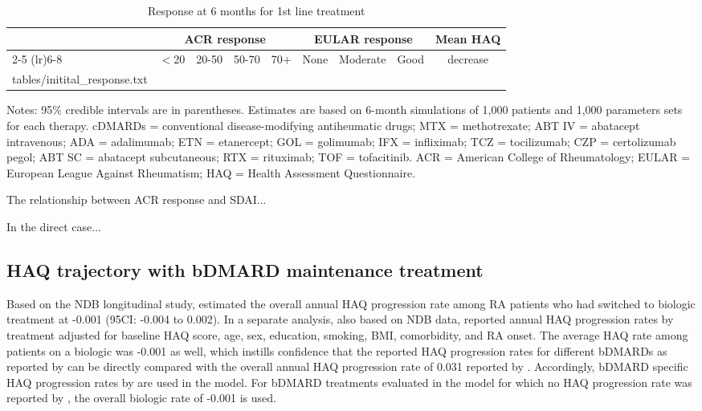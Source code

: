 \documentclass[11pt,final,fleqn]{article}\usepackage[]{graphicx}\usepackage[]{color}
\makeatletter
\theoremstyle{plain}
\newcommand*\ExpandableInput[1]{\@@input#1 }
\makeatother
\begin{document}
\begin{landscape}
\begin{table}[!ht]
\begin{center}
\begin{threeparttable}
\caption{Response at 6 months for 1st line treatment} \label{tbl:initial-haq}
\scriptsize
\begin{tabular}{lrrrrrrrr}
\hline
\multicolumn{1}{c}{} & \multicolumn{4}{c}{ACR response} & \multicolumn{3}{c}{EULAR response} & \multicolumn{1}{c}{\multirow{2}{*}{Mean HAQ}}\\
\cmidrule(lr){2-5} \cmidrule(lr){6-8}
\multicolumn{1}{l}{Treatment} & \multicolumn{1}{c}{$<$20} & \multicolumn{1}{c}{20-50} & \multicolumn{1}{c}{50-70}  & \multicolumn{1}{c}{70+}   & \multicolumn{1}{c}{None} & \multicolumn{1}{c}{Moderate}  & \multicolumn{1}{c}{Good}  & \multicolumn{1}{c}{decrease}\\
\hline
\ExpandableInput{tables/initital_response.txt}
\hline
\end{tabular}
\tiny
Notes: 95\% credible intervals are in parentheses. Estimates are based on 6-month simulations of 1,000 patients and 1,000 parameters sets for each therapy. cDMARDs = conventional disease-modifying antiheumatic drugs; MTX = methotrexate; ABT IV = abatacept intravenous; ADA = adalimumab; ETN = etanercept; GOL = golimumab; IFX = infliximab; TCZ = tocilizumab; CZP = certolizumab pegol; ABT SC = abatacept subcutaneous; RTX = rituximab; TOF = tofacitinib. ACR = American College of Rheumatology; EULAR = European League Against Rheumatism; HAQ = Health Assessment Questionnaire. 
\end{threeparttable}
\end{center}
\end{table}
\end{landscape}

The relationship between ACR response and SDAI...

In the direct case...

\subsection{HAQ trajectory with bDMARD maintenance treatment}
Based on the NDB longitudinal study, \citet{wolfe2010loss} estimated the overall annual HAQ progression rate among RA patients who had switched to biologic treatment at -0.001 (95CI: -0.004 to 0.002). In a separate analysis, also based on NDB data, \citet{michaud2011treatment} reported annual HAQ progression rates by treatment adjusted for baseline HAQ score, age, sex, education, smoking, BMI, comorbidity, and RA onset. The average HAQ rate among patients on a biologic was -0.001 as well, which instills confidence that the reported HAQ progression rates for different bDMARDs as reported by \citet{michaud2011treatment} can be directly compared with the overall annual HAQ progression rate of 0.031 reported by \citet{wolfe2010loss}. Accordingly, bDMARD specific HAQ progression rates by \citet{michaud2011treatment} are used in the model. For bDMARD treatments evaluated in the model for which no HAQ progression rate was reported by \citet{michaud2011treatment}, the overall biologic rate of -0.001 is used. 
\end{document}
